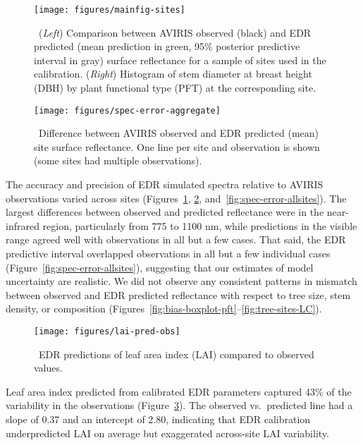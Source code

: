 \begin{figure}
  \centering
  \texttt{[image: figures/mainfig-sites]}
  \caption{\label{fig:spec-error-all}\
    (\emph{Left}) Comparison between AVIRIS observed (black) and
    EDR predicted (mean prediction in green, 95\% posterior predictive interval in gray)
    surface reflectance for a sample of sites used in the calibration.
    (\emph{Right}) Histogram of stem diameter at breast height (DBH) by plant functional type (PFT) at the corresponding site.
  }
\end{figure}

\begin{figure}
  \centering
  \texttt{[image: figures/spec-error-aggregate]}
  \caption{\label{fig:spec-error-aggregate}\
    Difference between AVIRIS observed and EDR predicted (mean) site surface reflectance.
    One line per site and observation is shown (some sites had multiple observations).
  }
\end{figure}

The accuracy and precision of EDR simulated spectra relative to AVIRIS observations varied across sites (Figures~\ref{fig:spec-error-all}, \ref{fig:spec-error-aggregate}, and~\ref{fig:spec-error-allsites}).
The largest differences between observed and predicted reflectance were in the near-infrared region, particularly from 775 to 1100 \unit{nm},
while predictions in the visible range agreed well with observations in all but a few cases.
That said, the EDR predictive interval overlapped observations in all but a few individual cases (Figure~\ref{fig:spec-error-allsites}), suggesting that our estimates of model uncertainty are realistic.
We did not observe any consistent patterns in mismatch between observed and EDR predicted reflectance with respect to tree size, stem density, or composition (Figures~\ref{fig:bias-boxplot-pft}--\ref{fig:tree-sites-LC}).

\begin{figure}
  \centering
  \texttt{[image: figures/lai-pred-obs]}
  \caption{\
    EDR predictions of leaf area index (LAI) compared to observed values.
  }\label{fig:lai-pred-obs}
\end{figure}

Leaf area index predicted from calibrated EDR parameters captured 43\% of the variability in the observations (Figure~\ref{fig:lai-pred-obs}).
The observed vs.\ predicted line had a slope of 0.37 and an intercept of 2.80, indicating that EDR calibration underpredicted LAI on average but exaggerated across-site LAI variability.

